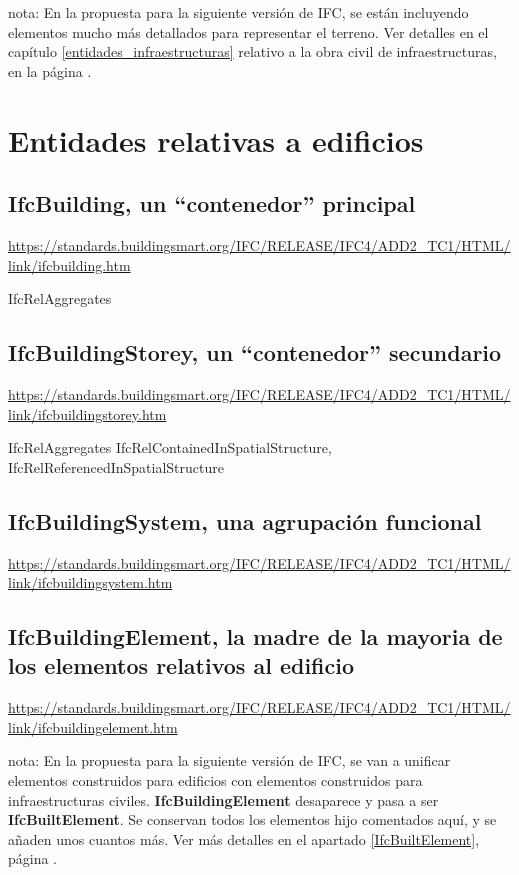 \documentclass[spanish,12pt,a4paper,final,oneside]{book}
\begin{document}
\vspace{3cm}
nota: En la propuesta para la siguiente versión de IFC, se están incluyendo elementos mucho más detallados para representar el terreno. Ver detalles en el capítulo \ref{entidades_infraestructuras} relativo a la obra civil de infraestructuras, en la página \pageref{entidades_infraestructuras}.







\chapter{Entidades relativas a edificios}

\section{IfcBuilding, un ``contenedor'' principal}
\url{https://standards.buildingsmart.org/IFC/RELEASE/IFC4/ADD2_TC1/HTML/link/ifcbuilding.htm}

IfcRelAggregates


\section{IfcBuildingStorey, un ``contenedor'' secundario}
\url{https://standards.buildingsmart.org/IFC/RELEASE/IFC4/ADD2_TC1/HTML/link/ifcbuildingstorey.htm}

IfcRelAggregates
IfcRelContainedInSpatialStructure, IfcRelReferencedInSpatialStructure



\section{IfcBuildingSystem, una agrupación funcional}
\url{https://standards.buildingsmart.org/IFC/RELEASE/IFC4/ADD2_TC1/HTML/link/ifcbuildingsystem.htm}


\section{IfcBuildingElement, la madre de la mayoria de los elementos relativos al edificio}
\url{https://standards.buildingsmart.org/IFC/RELEASE/IFC4/ADD2_TC1/HTML/link/ifcbuildingelement.htm}

nota: En la propuesta para la siguiente versión de IFC, se van a unificar elementos construidos para edificios con elementos construidos para infraestructuras civiles. \textbf{IfcBuildingElement} desaparece y pasa a ser \textbf{IfcBuiltElement}. Se conservan todos los elementos hijo comentados aquí, y se añaden unos cuantos más. \hspace{0.5cm}Ver más detalles en el apartado \ref{IfcBuiltElement}, página \pageref{IfcBuiltElement}.
\end{document}
